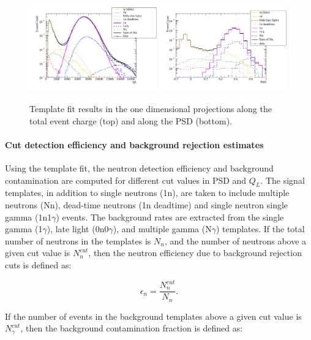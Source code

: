 \documentclass[letter,twocolumn,preprint,3p]{elsarticle}
\begin{document}
\begin{figure}[!htpb]
\centering 
\includegraphics[width = 0.49\textwidth] {figures/qlfit.pdf} 
\includegraphics[width = 0.49\textwidth] {figures/psdfit.pdf}  
\caption{ Template fit results in the one dimensional projections
  along the total event charge (top) and along the PSD (bottom).}
\label{fig:fits}
\end{figure}


\paragraph{Cut detection efficiency and background rejection estimates}

Using the template fit, the neutron detection efficiency and
background contamination are computed for different cut values in PSD
and $Q_L$.  The signal templates, in addition to single neutrons (1n),
are taken to include multiple neutrons (Nn), dead-time neutrons (1n
deadtime) and single neutron single gamma (1n1$\gamma$) events.  The
background rates are extracted from the single gamma (1$\gamma$), late
light (0n0$\gamma$), and multiple gamma (N$\gamma$) templates.  If the
total number of neutrons in the templates is $N_n$, and the number of
neutrons above a given cut value is $N_n^{cut}$, then the neutron
efficiency due to background rejection cuts is defined as:

\begin{equation}
\epsilon_n = \frac{N_n^{cut}}{N_n}.
\end{equation}

\noindent If the number of events in the background templates above a
given cut value is $N_{\gamma}^{cut}$, then the background
contamination fraction is defined as:
\end{document}
